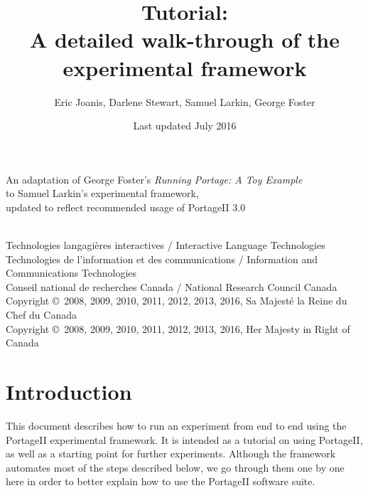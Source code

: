 \documentclass[11pt,letterpaper]{article}
\title{\PS Tutorial: \\
       A detailed walk-through of the \\
       experimental framework}
\date{Last updated July 2016}
\author{Eric Joanis, Darlene Stewart, Samuel Larkin, George Foster}
\newcommand{\PS}{PortageII\xspace}
\begin{document}
\vfill

\maketitle

\vfill

\begin{center}
An adaptation of George Foster's \emph{Running Portage: A Toy Example} \\
to Samuel Larkin's experimental framework,\\
updated to reflect recommended usage of PortageII 3.0
\end{center}

\vfill
\vfill

\begin{center}
{~} \\ \footnotesize
   Technologies langagières interactives /
      Interactive Language Technologies \\
   Technologies de l'information et des communications /
      Information and Communications Technologies \\
   Conseil national de recherches Canada /
      National Research Council Canada \\
   Copyright \copyright\ 2008, 2009, 2010, 2011, 2012, 2013, 2016, Sa Majesté la Reine du Chef du Canada
   \\ Copyright \copyright\ 2008, 2009, 2010, 2011, 2012, 2013, 2016, Her Majesty in Right of Canada
\end{center}

\vfill

\newpage


\tableofcontents


\newpage


\section{Introduction}

This document describes how to run an experiment from end to end using the \PS
experimental framework. It is intended as a tutorial on using \PS, as well as a
starting point for further experiments.  Although the framework automates most
of the steps described below, we go through them one by one here in order to
better explain how to use the \PS software suite.
\end{document}
